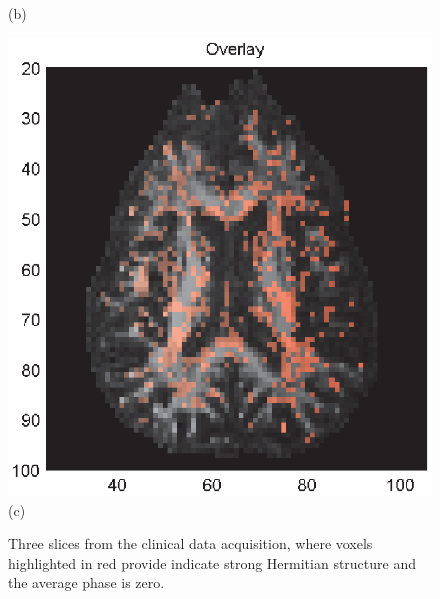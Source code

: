 \documentclass[authoryear,preprint,12pt]{elsarticle}
\begin{document}
\begin{figure}[!htbp]
\begin{center}
\begin{minipage}[]{.30\textwidth}
       (b)
 \end{minipage}
\begin{minipage}[]{.30\textwidth}
      \centering
        \includegraphics[width=\textwidth]{overlaynew55ny.eps}
    (c)
    \end{minipage}
  \end{center}
  \caption{Three slices from the clinical data acquisition, where
    voxels highlighted in red provide indicate strong Hermitian
    structure and the average phase is zero.}
  \label{fig3b} 
\end{figure}
\end{document}
